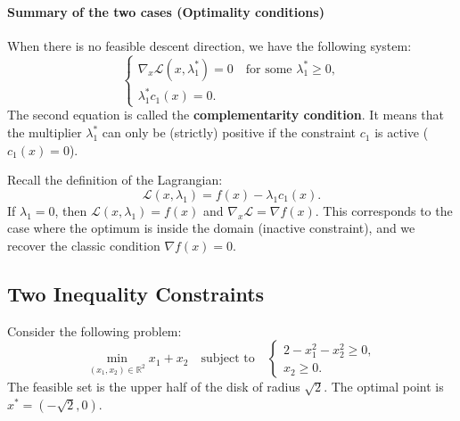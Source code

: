 \paragraph{Summary of the two cases (Optimality conditions)}
When there is no feasible descent direction, we have the following system:
\begin{equation}
    \begin{cases}
        \nabla_x \mathcal{L}(x, \lambda_1^*) = 0 \quad \text{for some } \lambda_1^* \ge 0, \\
        \lambda_1^* c_1(x) = 0.
    \end{cases}
\end{equation}
The second equation is called the \textbf{complementarity condition}.
It means that the multiplier $\lambda_1^*$ can only be (strictly) positive if the constraint $c_1$ is active ($c_1(x)=0$).

Recall the definition of the Lagrangian:
\begin{equation}
    \mathcal{L}(x, \lambda_1) = f(x) - \lambda_1 c_1(x).
\end{equation}
If $\lambda_1 = 0$, then $\mathcal{L}(x, \lambda_1) = f(x)$ and $\nabla_x \mathcal{L} = \nabla f(x)$. This corresponds to the case where the optimum is inside the domain (inactive constraint), and we recover the classic condition $\nabla f(x) = 0$.

\subsection{Two Inequality Constraints}

Consider the following problem:
\begin{equation}
    \min_{(x_1, x_2) \in \mathbb{R}^2} x_1 + x_2 \quad \text{subject to} \quad 
    \begin{cases}
        2 - x_1^2 - x_2^2 \ge 0, \\
        x_2 \ge 0.
    \end{cases}
\end{equation}
The feasible set is the upper half of the disk of radius $\sqrt{2}$.
The optimal point is $x^* = (-\sqrt{2}, 0)$.

